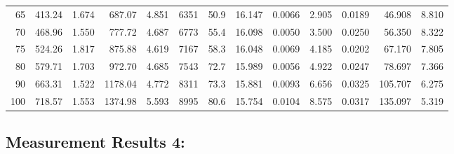 \documentclass[10pt]{article}
\begin{document}
{\begin{tabular}{|r|rr|rr|rr|rr|rr|r|r|}
       65 &       413.24 &        1.674 &       687.07 &        4.851 &         6351 &         50.9 &       16.147 &       0.0066 &        2.905 &       0.0189 &       46.908 &        8.810 \\
       70 &       468.96 &        1.550 &       777.72 &        4.687 &         6773 &         55.4 &       16.098 &       0.0050 &        3.500 &       0.0250 &       56.350 &        8.322 \\
       75 &       524.26 &        1.817 &       875.88 &        4.619 &         7167 &         58.3 &       16.048 &       0.0069 &        4.185 &       0.0202 &       67.170 &        7.805 \\
       80 &       579.71 &        1.703 &       972.70 &        4.685 &         7543 &         72.7 &       15.989 &       0.0056 &        4.922 &       0.0247 &       78.697 &        7.366 \\
       90 &       663.31 &        1.522 &      1178.04 &        4.772 &         8311 &         73.3 &       15.881 &       0.0093 &        6.656 &       0.0325 &      105.707 &        6.275 \\
      100 &       718.57 &        1.553 &      1374.98 &        5.593 &         8995 &         80.6 &       15.754 &       0.0104 &        8.575 &       0.0317 &      135.097 &        5.319 \\
\hline
\end{tabular}
}



\subsection*{\large \bf Measurement Results 4:}
\end{document}
